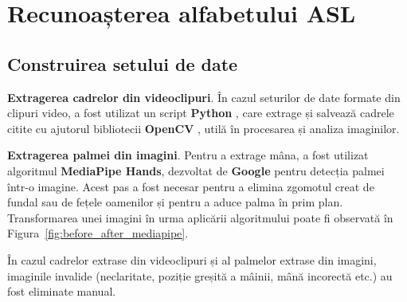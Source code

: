 \chapter{Recunoașterea alfabetului ASL}
\label{cap:cap2}

\section{Construirea setului de date}

\textbf{Extragerea cadrelor din videoclipuri}. În cazul seturilor de date formate din clipuri video, a fost utilizat un script \textbf{Python} \cite{python312}, care extrage și salvează cadrele citite cu ajutorul bibliotecii \textbf{OpenCV} \cite{opencv_library}, utilă în procesarea și analiza imaginilor.

\textbf{Extragerea palmei din imagini}. Pentru a extrage mâna, a fost utilizat algoritmul \textbf{MediaPipe Hands}, dezvoltat de \textbf{Google} \cite{zhang2020mediapipehandsondevicerealtime} pentru detecția palmei într-o imagine. Acest pas a fost necesar pentru a elimina zgomotul creat de fundal sau de fețele oamenilor și pentru a aduce palma în prim plan. Transformarea unei imagini în urma aplicării algoritmului poate fi observată în Figura~\ref{fig:before_after_mediapipe}.

În cazul cadrelor extrase din videoclipuri și al palmelor extrase din imagini, imaginile invalide (neclaritate, poziție greșită a mâinii, mână incorectă etc.) au fost eliminate manual.

